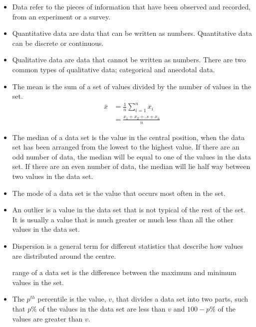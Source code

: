 \summary
\begin{itemize}[itemsep=6pt]
\item Data refer to the pieces of information that have been observed and recorded, from an experiment or a survey. 

\item Quantitative data are data that can be written as numbers.  Quantitative data can be discrete or continuous.

\item Qualitative data are data that cannot be written as numbers.  There are two common types of qualitative data; categorical and anecdotal data. 

\item The mean is the sum of a set of values divided by the number of values in the set. 
  \begin{align*}
    \overline{x} &= \frac{1}{n}\sum_{i=1}^n x_i \\
                 &= \frac{x_1 + x_2 + .s + x_n}{n}
  \end{align*}

\item The median of a data set is the value in the central position, when the data set has 
been arranged from the lowest to the highest value.  If there are an odd number of data, the median will be equal to one of the values in the data set. If there are an even number of data, the median will lie half way between two values in the data set. 

\item The mode of a data set is the value that occurs most often in the set. 

\item An outlier is a value in the data set that is not typical of the rest of the set. It is 
usually a value that is much greater or much less than all the other values in the data set.

\item Dispersion is a general term for different statistics that describe how values are distributed around the centre. 

\itemThe range of a data set is the difference between the maximum and minimum values 
in the set. 

\item The $p^{th}$ percentile is the value, $v$, that divides a data set into two parts, such that 
$p\%$ of the values in the data set are less than $v$ and $100 − p\%$ of the 
values are greater than $v$. 


\end{itemize}
